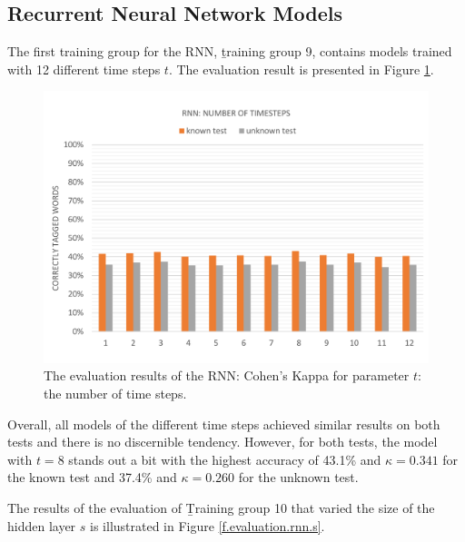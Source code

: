 \subsection{Recurrent Neural Network Models}\label{c.evaluation.results.rnn}
The first training group for the RNN, \b{training group 9}, contains models trained with 12 different time steps $t$. The evaluation result is presented in Figure \ref{f.evaluation.rnn.t}.

\begin{figure}[H]
	\hspace{-5mm}\includegraphics[width=1.07\textwidth]{images/evaluation_rnn_t}
	\caption[RNN Evaluation: Number of Time Steps]{The evaluation results of the RNN: Cohen's Kappa for parameter $t$: the number of time steps.}
	\label{f.evaluation.rnn.t}
\end{figure}

Overall, all models of the different time steps achieved similar results on both tests and there is no discernible tendency. However, for both tests, the model with $t=8$ stands out a bit with the highest accuracy of 43.1\% and $\kappa=0.341$ for the known test and 37.4\% and $\kappa=0.260$ for the unknown test.

The results of the evaluation of \b{Training group 10} that varied the size of the hidden layer $s$ is illustrated in Figure \ref{f.evaluation.rnn.s}.

